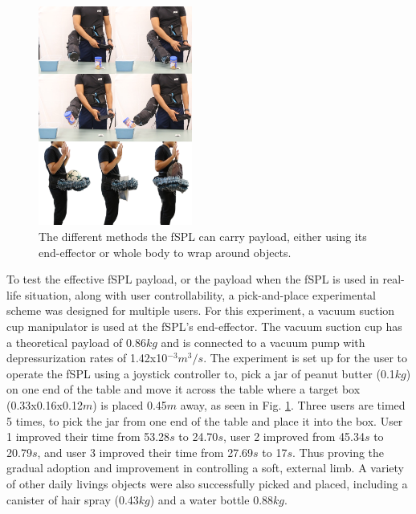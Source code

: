 \documentclass[letterpaper, 10 pt, conference]{ieeeconf}  %
\begin{document}
\begin{figure}[b!]
\centering
\includegraphics[width=0.45\textwidth]{Figures/pick_place_whole_body}
\caption{The different methods the fSPL can carry payload, either using its end-effector or whole body to wrap around objects.}
\label{fig:pick_place_whole_body}
\vspace{-1.5em}
\end{figure}

To test the effective fSPL payload, or the payload when the fSPL is used in real-life situation, along with user controllability, a pick-and-place experimental scheme was designed for multiple users. For this experiment, a vacuum suction cup manipulator is used at the fSPL's end-effector. The vacuum suction cup has a theoretical payload of 0.86$kg$ and is connected to a vacuum pump with depressurization rates of 1.42x10$^{-3}m^3/s$. The experiment is set up for the user to operate the fSPL using a joystick controller to, pick a jar of peanut butter (0.1$kg$) on one end of the table and move it across the table where a target box (0.33x0.16x0.12$m$) is placed 0.45$m$ away, as seen in Fig. \ref{fig:pick_place_whole_body}. Three users are timed 5 times, to pick the jar from one end of the table and place it into the box.   User 1 improved their time from 53.28$s$ to 24.70$s$, user 2 improved from 45.34$s$ to 20.79$s$, and user 3 improved their time from 27.69$s$ to 17$s$. Thus proving the gradual adoption and improvement in controlling a soft, external limb. A variety of other daily livings objects were also successfully picked and placed, including a canister of hair spray (0.43$kg$) and a water bottle 0.88$kg$.


\end{document}
